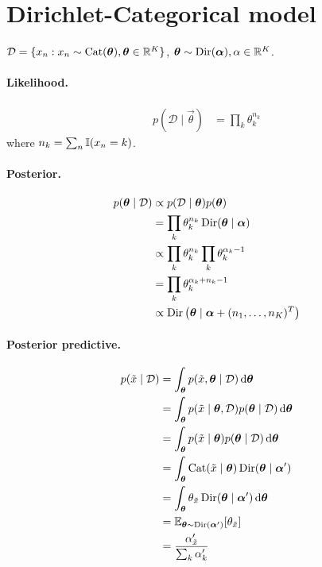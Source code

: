 \section{Dirichlet-Categorical model}
$\mathcal D = \{x_n : x_n \sim \operatorname{Cat}(\boldsymbol{\mathbf{\theta}}), \boldsymbol{\mathbf{\theta}} \in \mathbb R^K\}$, $\boldsymbol{\mathbf{\theta}} \sim \operatorname{Dir}(\boldsymbol{\mathbf{\alpha}}), \alpha \in \mathbb R^K$.

\paragraph{Likelihood.}
    \begin{align*}
        p(\mathcal D \mid \vec \theta) &= \prod_k \theta_k^{n_k}
    \end{align*}
    where $n_k = \sum_n \operatorname{\mathbb I}(x_n = k)$.

\paragraph{Posterior.}
    \begin{align*}
        p(\boldsymbol{\mathbf{\theta}} \mid \mathcal D)  &\propto p(\mathcal D \mid \boldsymbol{\mathbf{\theta}}) p(\boldsymbol{\mathbf{\theta}}) \\
                                        &= \prod_k \theta_k^{n_k} \operatorname{Dir}(\boldsymbol{\mathbf{\theta}} \mid \boldsymbol{\mathbf{\alpha}}) \\
                                        &\propto \prod_k \theta_k^{n_k} \prod_k \theta_k^{\alpha_k - 1} \\
                                        &= \prod_k \theta_k^{\alpha_k + n_k - 1} \\
                                        &\propto \operatorname{Dir}\left(\boldsymbol{\mathbf{\theta}} \mid \boldsymbol{\mathbf{\alpha}} + (n_1, \dotsc, n_K)^T\right)
    \end{align*}

\paragraph{Posterior predictive.}
    \begin{align*}
        p(\tilde x \mid \mathcal D)     &= \int_{\boldsymbol{\mathbf{\theta}}} p(\tilde x, \boldsymbol{\mathbf{\theta}} \mid \mathcal D) \,\mathrm d\boldsymbol{\mathbf{\theta}} \\
                                        &= \int_{\boldsymbol{\mathbf{\theta}}} p(\tilde x \mid \boldsymbol{\mathbf{\theta}}, \mathcal D) p(\boldsymbol{\mathbf{\theta}} \mid \mathcal D) \,\mathrm d\boldsymbol{\mathbf{\theta}} \\
                                        &= \int_{\boldsymbol{\mathbf{\theta}}} p(\tilde x \mid \boldsymbol{\mathbf{\theta}}) p(\boldsymbol{\mathbf{\theta}} \mid \mathcal D) \,\mathrm d\boldsymbol{\mathbf{\theta}} \\
                                        &= \int_{\boldsymbol{\mathbf{\theta}}} \operatorname{Cat}(\tilde x \mid \boldsymbol{\mathbf{\theta}}) \operatorname{Dir}(\boldsymbol{\mathbf{\theta}} \mid \boldsymbol{\mathbf{\alpha}}') \\
                                        &= \int_{\boldsymbol{\mathbf{\theta}}} \theta_{\tilde x} \operatorname{Dir}(\boldsymbol{\mathbf{\theta}} \mid \boldsymbol{\mathbf{\alpha}}') \,\mathrm d\boldsymbol{\mathbf{\theta}} \\
                                        &= \operatorname{\mathbb{E}}_{\boldsymbol{\mathbf{\theta}} \sim \operatorname{Dir}(\boldsymbol{\mathbf{\alpha}}')}[\theta_{\tilde x}] \\
                                        &= \frac{\alpha'_{\tilde x}}{\sum_k \alpha'_k}
    \end{align*}

